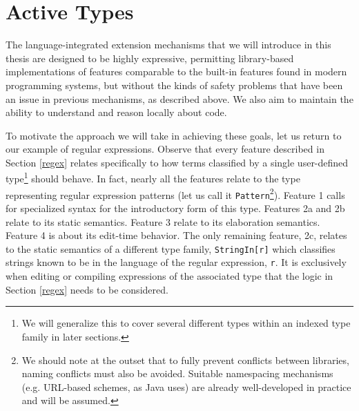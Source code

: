 \section{Active Types}\label{contributions}
The language-integrated extension mechanisms that we will introduce in this thesis are designed to be highly {expressive}, permitting library-based implementations of features comparable to the built-in features found in modern programming systems, but without the kinds of {safety} problems that have been an issue in previous mechanisms, as described above. We also aim to maintain the ability to understand and reason locally about code. %

To motivate the approach we will take in achieving these goals, let us return to our example of regular expressions. Observe that every feature described in Section \ref{regex} relates specifically to how terms  classified by a single user-defined type\footnote{We will generalize this to cover several different types within an indexed type family in later sections.} should behave. In fact, nearly all the features relate to the type representing regular expression patterns (let us call it \verb|Pattern|\footnote{We should note at the outset that to fully prevent conflicts between libraries, naming conflicts must also be avoided. Suitable namespacing mechanisms (e.g. URL-based schemes, as Java uses) are already well-developed in practice  and will be assumed.}). Feature 1 calls for specialized syntax for the introductory form of this type. Features 2a and 2b relate to its static semantics. Feature 3 relate to its elaboration semantics. Feature 4 is about its edit-time behavior. The only remaining feature, 2c, relates to the static semantics of a different type family, \verb|StringIn[r]| which classifies strings known to be in the language of the regular expression, \verb|r|. It is exclusively when editing or compiling expressions of the associated type that the logic in Section \ref{regex}  needs to be considered. 

